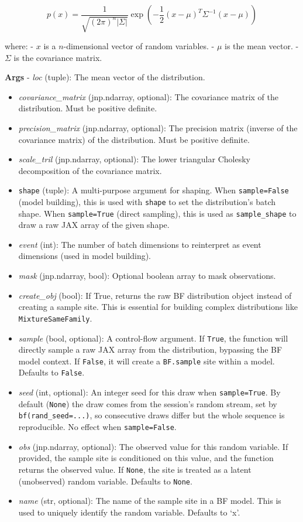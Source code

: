 \documentclass[
  letterpaper,
  DIV=11,
  numbers=noendperiod]{scrartcl}
\begin{document}
\[
     p(x) = \frac{1}{\sqrt{(2\pi)^n |\Sigma|}} \exp\left(-\frac{1}{2}(x - \mu)^T \Sigma^{-1} (x - \mu)\right)
  \]

where: - \(x\) is a \(n\)-dimensional vector of random variables. -
\(\mu\) is the mean vector. - \(\Sigma\) is the covariance matrix.

\textbf{Args} - \emph{loc} (tuple): The mean vector of the distribution.

\begin{itemize}
\item
  \emph{covariance\_matrix} (jnp.ndarray, optional): The covariance
  matrix of the distribution. Must be positive definite.
\item
  \emph{precision\_matrix} (jnp.ndarray, optional): The precision matrix
  (inverse of the covariance matrix) of the distribution. Must be
  positive definite.
\item
  \emph{scale\_tril} (jnp.ndarray, optional): The lower triangular
  Cholesky decomposition of the covariance matrix.
\item
  \texttt{shape} (tuple): A multi-purpose argument for shaping. When
  \texttt{sample=False} (model building), this is used with
  \texttt{shape} to set the distribution's batch shape. When
  \texttt{sample=True} (direct sampling), this is used as
  \texttt{sample\_shape} to draw a raw JAX array of the given shape.
\item
  \emph{event} (int): The number of batch dimensions to reinterpret as
  event dimensions (used in model building).
\item
  \emph{mask} (jnp.ndarray, bool): Optional boolean array to mask
  observations.
\item
  \emph{create\_obj} (bool): If True, returns the raw BF distribution
  object instead of creating a sample site. This is essential for
  building complex distributions like \texttt{MixtureSameFamily}.
\item
  \emph{sample} (bool, optional): A control-flow argument. If
  \texttt{True}, the function will directly sample a raw JAX array from
  the distribution, bypassing the BF model context. If \texttt{False},
  it will create a \texttt{BF.sample} site within a model. Defaults to
  \texttt{False}.
\item
  \emph{seed} (int, optional): An integer seed for this draw when
  \texttt{sample=True}. By default (\texttt{None}) the draw comes from
  the session's random stream, set by \texttt{bf(rand\_seed=...)}, so
  consecutive draws differ but the whole sequence is reproducible. No
  effect when \texttt{sample=False}.
\item
  \emph{obs} (jnp.ndarray, optional): The observed value for this random
  variable. If provided, the sample site is conditioned on this value,
  and the function returns the observed value. If \texttt{None}, the
  site is treated as a latent (unobserved) random variable. Defaults to
  \texttt{None}.
\item
  \emph{name} (str, optional): The name of the sample site in a BF
  model. This is used to uniquely identify the random variable. Defaults
  to `x'.
\end{itemize}
\end{document}
